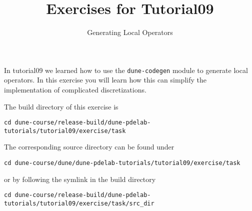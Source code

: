 \documentclass[12pt,a4paper]{article}
\title{\textbf{Exercises for Tutorial09}}
\subtitle{Generating Local Operators}
\begin{document}
\exerciseheader

In tutorial09 we learned how to use the \lstinline{dune-codegen} module to
generate local operators. In this exercise you will learn how this can simplify
the implementation of complicated discretizations.

The build directory of this exercise is
\begin{lstlisting}
cd dune-course/release-build/dune-pdelab-tutorials/tutorial09/exercise/task
\end{lstlisting}

The corresponding source directory can be found under
\begin{lstlisting}
cd dune-course/dune/dune-pdelab-tutorials/tutorial09/exercise/task
\end{lstlisting}
or by following the symlink in the build directory
\begin{lstlisting}
cd dune-course/release-build/dune-pdelab-tutorials/tutorial09/exercise/task/src_dir
\end{lstlisting}
\end{document}

